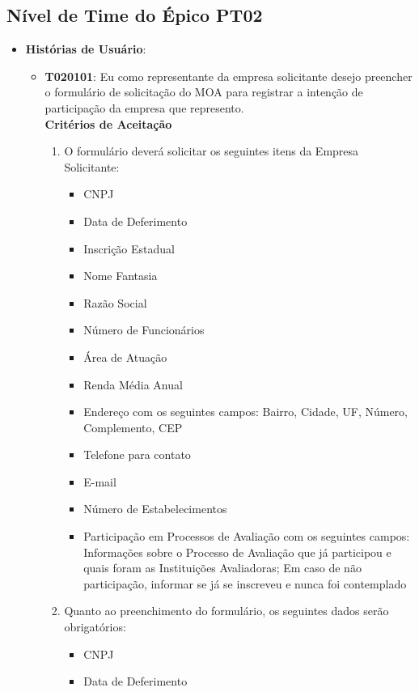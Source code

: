 \subsection[Nível de Time do Épico PT02]{Nível de Time do Épico PT02}
\label{subsec:requisitos_levantamento_programa}
	\begin{itemize}
		\item{\textbf{Histórias de Usuário}:
			\begin{itemize}
				\item{\textbf{T020101}: Eu como representante da empresa solicitante desejo preencher  o formulário de solicitação do MOA para registrar a intenção de participação da empresa que represento.
				\\ \textbf{Critérios de Aceitação}
				\begin{enumerate}
					\item{O formulário deverá solicitar os seguintes itens da Empresa Solicitante:
					\begin{itemize}
						\item{CNPJ}
						\item{Data de Deferimento}
						\item{Inscrição Estadual}
						\item{Nome Fantasia}
						\item{Razão Social}
						\item{Número de Funcionários}
						\item{Área de Atuação}
						\item{Renda Média Anual}
						\item{Endereço com os seguintes campos: Bairro, Cidade, UF, Número, Complemento, CEP}
						\item{Telefone para contato}
						\item{E-mail}
						\item{Número de Estabelecimentos}
						\item{Participação em Processos de Avaliação com os seguintes campos: Informações sobre o Processo de Avaliação que já participou e quais foram as Instituições Avaliadoras; Em caso de não participação, informar se já se inscreveu e nunca foi contemplado}
					\end{itemize}}
					\item{Quanto ao preenchimento do formulário, os seguintes dados serão obrigatórios:
					\begin{itemize}
						\item{CNPJ}
						\item{Data de Deferimento}

\end{itemize}}
\end{enumerate}}
\end{itemize}}
\end{itemize}
